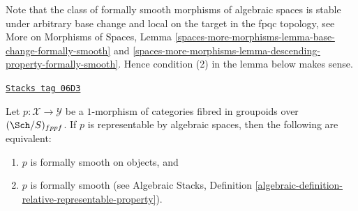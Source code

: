 Note that the class of formally smooth morphisms of algebraic spaces is
stable under arbitrary base change and local on the target in the
fpqc topology, see
More on Morphisms of Spaces,
Lemma \ref{spaces-more-morphisms-lemma-base-change-formally-smooth} and
\ref{spaces-more-morphisms-lemma-descending-property-formally-smooth}.
Hence condition (2) in the lemma below makes sense.

\begin{lemma}
\label{criteria-lemma-representable-by-spaces-formally-smooth}
\href{https://stacks.math.columbia.edu/tag/06D3}{\texttt{Stacks tag 06D3}}

Let $p : \mathcal{X} \to \mathcal{Y}$ be a $1$-morphism of categories
fibred in groupoids over $(\Sch/S)_{fppf}$. If $p$ is
representable by algebraic spaces, then the following are equivalent:
\begin{enumerate}
\item $p$ is formally smooth on objects, and
\item $p$ is formally smooth (see
Algebraic Stacks,
Definition \ref{algebraic-definition-relative-representable-property}).
\end{enumerate}
\end{lemma}

